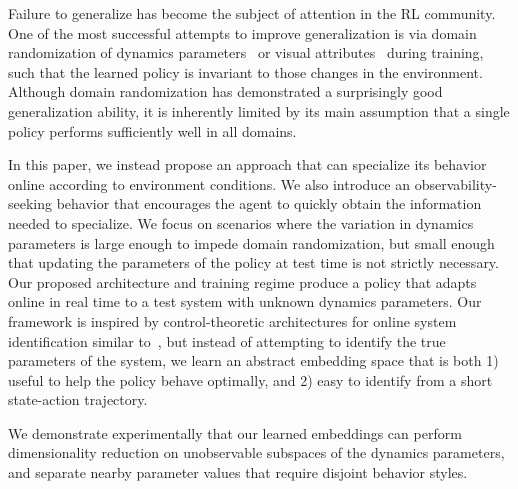 \documentclass{article}
\newcommand{\TODO}[1]{\textcolor{red}{\textbf{TODO: #1}}}
\begin{document}
Failure to generalize has become the subject of attention in the RL community.
One of the most successful attempts to improve generalization is via domain randomization of dynamics parameters~\citep{antonova-pivoting-corr17, zhu-RL-IL-diverse}
or visual attributes~\citep{sadeghi-cad2rl-rss17,tobin-domainrand-arxiv17,james-domain-xfer} during training, such that the learned policy is invariant to those changes in the environment.
Although domain randomization has demonstrated a surprisingly good generalization ability,
it is inherently limited by its main assumption that a single policy performs sufficiently well in all domains.


In this paper, we instead propose an approach that can specialize its behavior online according to environment conditions. 
We also introduce an observability-seeking behavior that encourages the agent to quickly obtain the information needed to specialize. 
We focus on scenarios where the variation in dynamics parameters
is large enough to impede domain randomization,
but small enough that updating the parameters of the policy at test time is not strictly necessary.
Our proposed architecture and training regime produce a policy
that adapts online in real time to a test system with unknown dynamics parameters.
Our framework is inspired by control-theoretic architectures for online system identification
similar to~\citet{yu-up-osi-rss17},
but instead of attempting to identify the true parameters of the system,
we learn an abstract embedding space that is both
1) useful to help the policy behave optimally, and
2) easy to identify from a short state-action trajectory.

We demonstrate experimentally that our learned embeddings can perform dimensionality reduction on unobservable subspaces of the dynamics parameters,
and separate nearby parameter values that require disjoint behavior styles.
\end{document}
